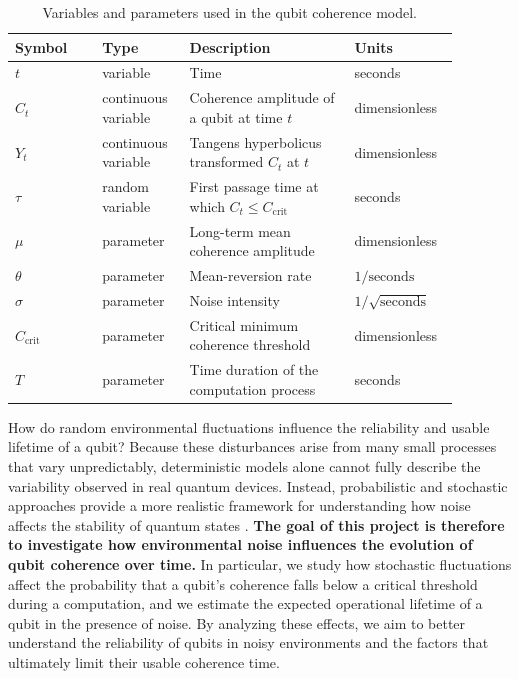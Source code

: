 \documentclass[
	a4paper, %
	10pt, %
	unnumberedsections, %
	twoside, %
]{LTJournalArticle}
\begin{document}
\begin{table}
\caption{Variables and parameters used in the qubit coherence model.}
\centering
\begin{tabular}{L{0.18\linewidth} L{0.18\linewidth} L{0.34\linewidth} L{0.18\linewidth}}
\toprule
Symbol & Type & Description & Units \\
\midrule

$t$ & variable & Time & seconds \\

$C_t$ & continuous variable & Coherence amplitude of a qubit at time $t$ & dimensionless \\

$Y_t$ & continuous variable & Tangens hyperbolicus transformed $C_t$ at $t$ & dimensionless \\

$\tau$ & random variable & First passage time at which $C_t \le C_{\text{crit}}$ & seconds \\

$\mu$ & parameter & Long-term mean coherence amplitude & dimensionless \\

$\theta$ & parameter & Mean-reversion rate & $1/\text{seconds}$ \\

$\sigma$ & parameter & Noise intensity & $1/\sqrt{\text{seconds}}$ \\

$C_{\text{crit}}$ & parameter & Critical minimum coherence threshold & dimensionless \\

$T$ & parameter & Time duration of the computation process & seconds \\

\bottomrule
\end{tabular}
\label{tab:variables}
\end{table}

How do random environmental fluctuations influence the reliability and usable lifetime of a qubit? Because these disturbances arise from many small processes that vary unpredictably, deterministic models alone cannot fully describe the variability observed in real quantum devices. Instead, probabilistic and stochastic approaches provide a more realistic framework for understanding how noise affects the stability of quantum states \autocite{10.1007/978-1-4419-8907-9_52}. \textbf{The goal of this project is therefore to investigate how environmental noise influences the evolution of qubit coherence over time.} In particular, we study how stochastic fluctuations affect the probability that a qubit’s coherence falls below a critical threshold during a computation, and we estimate the expected operational lifetime of a qubit in the presence of noise. By analyzing these effects, we aim to better understand the reliability of qubits in noisy environments and the factors that ultimately limit their usable coherence time.
\end{document}
